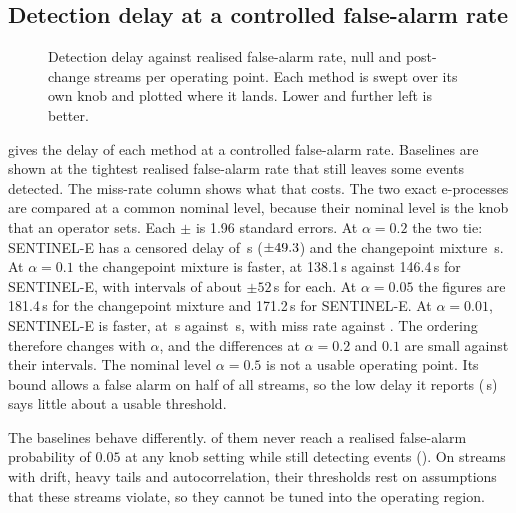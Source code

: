 
\subsection{Detection delay at a controlled false-alarm rate}
\label{sec:delay}

\begin{figure}[t]
  \centering
  \caption{Detection delay against realised false-alarm rate, \ExpTwoReps{} null
  and \ExpTwoReps{} post-change streams per operating point. Each method is swept
  over its own knob and plotted where it lands. Lower and further left is better.}
  \label{fig:delayfar}
\end{figure}


 gives the delay of each method at a controlled false-alarm
rate. Baselines are shown at the tightest realised false-alarm rate that still leaves
some events detected. The miss-rate column shows what that costs. The two exact e-processes are compared at a common nominal
level, because their nominal level is the knob that an operator sets.
Each $\pm$ is 1.96 standard errors. At $\alpha=0.2$ the two tie: SENTINEL-E has a
censored delay of \EqSEFifthDelaySec\,s ($\pm49.3$) and the changepoint
mixture \EqCpFifthDelaySec\,s. At $\alpha=0.1$ the changepoint mixture is faster,
at 138.1\,s against 146.4\,s for SENTINEL-E, with intervals of about $\pm52$\,s for
each. At $\alpha=0.05$ the figures are 181.4\,s for the changepoint mixture and
171.2\,s for SENTINEL-E. At $\alpha=0.01$, SENTINEL-E is faster, at
\EqSEHundredthDelaySec\,s against \EqCpHundredthDelaySec\,s, with miss rate
\EqSEHundredthMiss{} against \EqCpHundredthMiss. The ordering therefore changes
with $\alpha$, and the differences at $\alpha=0.2$ and $0.1$ are small against
their intervals. The nominal level
$\alpha=0.5$ is not a usable operating point. Its bound allows a false alarm on
half of all streams, so the low delay it reports (\EqSEHalfDelaySec\,s) says
little about a usable threshold.

The baselines behave differently. \DelayNumInadmissible{} of them never reach a
realised false-alarm probability of $0.05$ at any knob setting while still
detecting events (\DelayInadmissibleList). On streams with drift, heavy tails and
autocorrelation, their thresholds rest on assumptions that these streams violate, so they cannot be tuned into the operating region.

